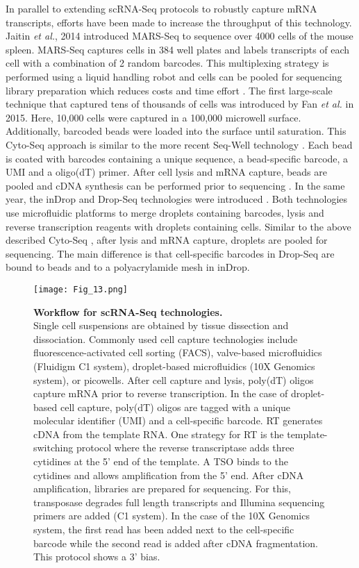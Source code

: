 In parallel to extending scRNA-Seq protocols to robustly capture mRNA transcripts, efforts have been made to increase the throughput of this technology. 
Jaitin \emph{et al.}, 2014 introduced \gls{MARS-Seq} to sequence over 4000 cells of the mouse spleen. 
MARS-Seq captures cells in 384 well plates and labels transcripts of each cell with a combination of 2 random barcodes. 
This multiplexing strategy is performed using a liquid handling robot and cells can be pooled for sequencing library preparation which reduces costs and time effort \citep{Jaitin2014}. 
The first large-scale technique that captured tens of thousands of cells was introduced by Fan \emph{et al.} in 2015. 
Here, 10,000 cells were captured in a 100,000 microwell surface. 
Additionally, barcoded beads were loaded into the surface until saturation. 
This Cyto-Seq approach is similar to the more recent Seq-Well technology \citep{Gierahn2017}. 
Each bead is coated with barcodes containing a unique sequence, a bead-specific barcode, a UMI and a oligo(dT) primer. After cell lysis and mRNA capture, beads are pooled and cDNA synthesis can be performed prior to sequencing \citep{Fan2015}. 
In the same year, the inDrop and Drop-Seq technologies were introduced \citep{Klein2015, Macosko2015}. 
Both technologies use microfluidic platforms to merge droplets containing barcodes, lysis and reverse transcription reagents with droplets containing cells. 
Similar to the above described Cyto-Seq \citep{Fan2015}, after lysis and mRNA capture, droplets are pooled for sequencing. 
The main difference is that cell-specific barcodes in Drop-Seq are bound to beads and to a polyacrylamide mesh in inDrop.  

\begin{figure}[!h]
\centering
\texttt{[image: Fig\_13.png]}
\caption[Workflow for scRNA-Seq technologies]{\textbf{Workflow for scRNA-Seq technologies.}\\
Single cell suspensions are obtained by tissue dissection and dissociation. 
Commonly used cell capture technologies include fluorescence-activated cell sorting (FACS), valve-based microfluidics (Fluidigm\textsuperscript{\textregistered{}} C1 system), droplet-based microfluidics (10X Genomics\textsuperscript{\textregistered{}} system), or picowells. 
After cell capture and lysis, poly(dT) oligos capture mRNA prior to reverse transcription. 
In the case of droplet-based cell capture, poly(dT) oligos are tagged with a unique molecular identifier (UMI) and a cell-specific barcode. 
\Gls{RT} generates cDNA from the template RNA. One strategy for RT is the template-switching protocol where the reverse transcriptase adds three cytidines at the 5' end of the template. 
A \gls{TSO} binds to the cytidines and allows amplification from the 5' end. 
After cDNA amplification, libraries are prepared for sequencing. For this, transposase degrades full length transcripts and Illumina sequencing primers are added (C1 system). 
In the case of the 10X Genomics system, the first read has been added next to the cell-specific barcode while the second read is added after cDNA fragmentation. This protocol shows a 3' bias.}
\label{fig0:scRNA-Seq}
\end{figure}

